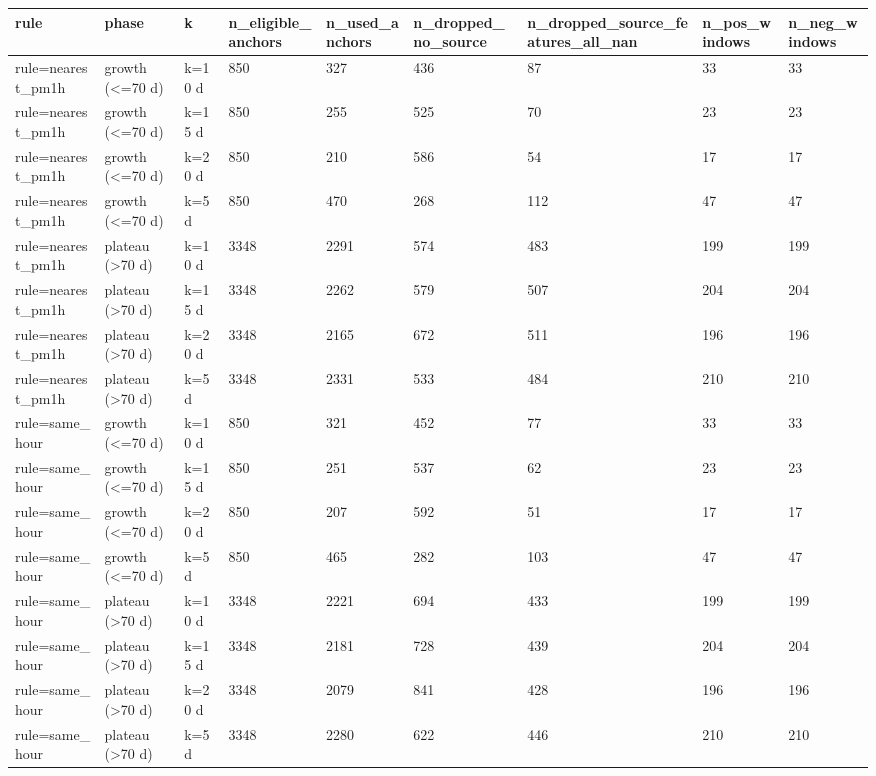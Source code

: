 \begin{tabular}{lllllllll}
\hline
rule & phase & k & n\_eligible\_anchors & n\_used\_anchors & n\_dropped\_no\_source & n\_dropped\_source\_features\_all\_nan & n\_pos\_windows & n\_neg\_windows \\
\hline
rule=nearest\_pm1h & growth (<=70 d) & k=10 d & 850 & 327 & 436 & 87 & 33 & 33 \\
rule=nearest\_pm1h & growth (<=70 d) & k=15 d & 850 & 255 & 525 & 70 & 23 & 23 \\
rule=nearest\_pm1h & growth (<=70 d) & k=20 d & 850 & 210 & 586 & 54 & 17 & 17 \\
rule=nearest\_pm1h & growth (<=70 d) & k=5 d & 850 & 470 & 268 & 112 & 47 & 47 \\
rule=nearest\_pm1h & plateau (>70 d) & k=10 d & 3348 & 2291 & 574 & 483 & 199 & 199 \\
rule=nearest\_pm1h & plateau (>70 d) & k=15 d & 3348 & 2262 & 579 & 507 & 204 & 204 \\
rule=nearest\_pm1h & plateau (>70 d) & k=20 d & 3348 & 2165 & 672 & 511 & 196 & 196 \\
rule=nearest\_pm1h & plateau (>70 d) & k=5 d & 3348 & 2331 & 533 & 484 & 210 & 210 \\
rule=same\_hour & growth (<=70 d) & k=10 d & 850 & 321 & 452 & 77 & 33 & 33 \\
rule=same\_hour & growth (<=70 d) & k=15 d & 850 & 251 & 537 & 62 & 23 & 23 \\
rule=same\_hour & growth (<=70 d) & k=20 d & 850 & 207 & 592 & 51 & 17 & 17 \\
rule=same\_hour & growth (<=70 d) & k=5 d & 850 & 465 & 282 & 103 & 47 & 47 \\
rule=same\_hour & plateau (>70 d) & k=10 d & 3348 & 2221 & 694 & 433 & 199 & 199 \\
rule=same\_hour & plateau (>70 d) & k=15 d & 3348 & 2181 & 728 & 439 & 204 & 204 \\
rule=same\_hour & plateau (>70 d) & k=20 d & 3348 & 2079 & 841 & 428 & 196 & 196 \\
rule=same\_hour & plateau (>70 d) & k=5 d & 3348 & 2280 & 622 & 446 & 210 & 210 \\
\hline
\end{tabular}
